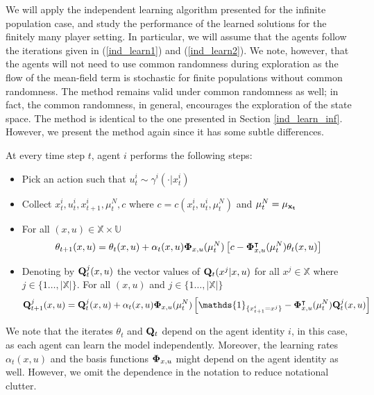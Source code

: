\documentclass[twoside,11pt]{article}
\begin{document}
We will apply the independent learning algorithm presented for the infinite population case, and study the performance of the learned solutions for the finitely many player setting. In particular, we will assume that the agents follow the iterations given in (\ref{ind_learn1}) and (\ref{ind_learn2}). We note, however, that the agents will not need to use common randomness during exploration as the flow of the mean-field term is stochastic for finite populations without common randomness. The method remains valid under common randomness as well; in fact, the common randomness, in general, encourages the exploration of the state space. The method is identical to the one presented in Section \ref{ind_learn_inf}. However, we present the method again since it has some subtle differences. 

At every time step $t$, agent $i$ performs the following steps:
\begin{itemize}
\item Pick an action such that $u^i_t\sim \gamma^i(\cdot|x^i_t)$
\item Collect $x^i_t,u^i_t,x^i_{t+1},\mu^N_t ,c$ where $c=c(x^i_t,u^i_t,\mu^N_t)$ and $\mu_t^N=\mu_{\bf x_t}$
\item For all $(x,u)\in\mathds{X}\times\mathds{U}$
\begin{align}\label{finite_ind1}
{\bf \theta}_{t+1}(x,u) = {\bf \theta}_t(x,u) + \alpha_t(x,u){\bf \Phi}_{x,u}(\mu^N_t)\left[c-{\bf \Phi}^\intercal_{x,u}(\mu^N_t) {\bf \theta}_t(x,u)\right]
\end{align}
\item  Denoting by ${\bf Q}^j_t(x,u)$ the vector values of  ${\bf Q}_t(x^j|x,u)$ for all $x^j\in \mathds{X}$ where $j\in\{1\dots,|\mathds{X}|\}$. For all $(x,u)$ and $j\in\{1\dots,|\mathds{X}|\}$
\begin{align}\label{finite_ind2}
{\bf Q}_{t+1}^j(x,u) = {\bf Q}_t^j(x,u) + \alpha_t(x,u) {\bf \Phi}_{x,u}(\mu^N_t)\left[\mathds{1}_{\{x^i_{t+1}=x^j\}} - {\bf \Phi}_{x,u}^\intercal(\mu^N_t) {\bf Q}_t^j(x,u) \right]
\end{align}
\end{itemize}

\begin{remark}
We note that the iterates $\theta_t$ and ${\bf Q}_t$ depend on the agent identity $i$, in this case, as each agent can learn the model independently. Moreover, the learning rates $\alpha_t(x,u)$ and the basis functions ${\bf\Phi}_{x,u}$ might depend on the agent identity as well. However, we omit the dependence in the notation to reduce notational clutter. 
\end{remark}
\end{document}
